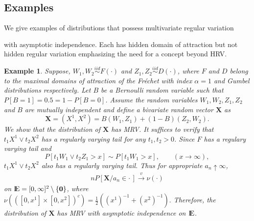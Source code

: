 \documentclass[11 pt]{amsart}
\newtheorem{ex}[thm]{Example}
\numberwithin{equation}{section}
\begin{document}
\subsection{Examples}\label{subsec:egs}
{We give} examples of distributions that  possess
{multivariate regular variation } {with asymptotic independence. Each has {hidden domain of attraction }
 but not hidden regular variation  emphasizing the need for
{a concept beyond HRV.}

\begin{ex}
{\rm{ Suppose, $W_1, W_2 \stackrel{iid}{\sim}  F(\cdot)$ and $Z_1, Z_2
    \stackrel{iid}{\sim} D(\cdot)$, where $F$ and $D$ belong to the
    maximal domain{s} of attraction of {the}  Fr\'{e}chet with
    index $\alpha =1$ and  Gumbel
    distribution{s} respectively.  Let $B$ be a Bernoulli random variable
    such that $P[ B = 1] = 0.5 = 1- P[ B = 0]$.   {A}ssume  the
    random variables $W_1, W_2, Z_1, Z_2$ and $B$ are mutually
    independent {and} define a bivariate random vector ${\boldsymbol X}$ as 
$$ {\boldsymbol X} = (X^1, X^2) = B(W_1, Z_1) + (1- B)(Z_2, W_2).$$
We show that the distribution of ${\boldsymbol X}$ has MRV.
It {suffices} \citep{dehaan:1978}
to  verify that
$t_1X^1 \vee t_2X^2$ has a {regularly varying tail for any $t_1,
  t_2 > 0$.}  {Since $F$ has a regulary varying tail and}
\begin{equation*}
P[ t_1W_1 \vee t_2Z_1 > x] {\sim} P[t_1W_1 > x], \qquad (x \to
\infty),
\end{equation*}
$t_1X^1 \vee t_2X^2$ also has a regularly varying tail. Thus for
{appropriate $a_n \uparrow \infty$,}
\begin{align*}
nP\left[ {\boldsymbol X}/{a_n} \in \cdot \, \right] \stackrel{v}{\rightarrow} \nu(\cdot)
\end{align*}
on ${\mathop{\rm I\kern -0.20em E}\nolimits} = [0, \infty]^2 \setminus \{{\boldsymbol 0} \}$, where $\nu\left(
  {\left( [0, x^1] \times [0, x^2] \right)}^c \right) =
\frac{1}{2}\left({\left(x^1\right)}^{-1} +
  {\left(x^2\right)}^{-1}\right).$ Therefore, the distribution of
${\boldsymbol X}$ has MRV with asymptotic independence on ${\mathop{\rm I\kern -0.20em E}\nolimits}$. 

}}
\end{ex}}
\end{document}
